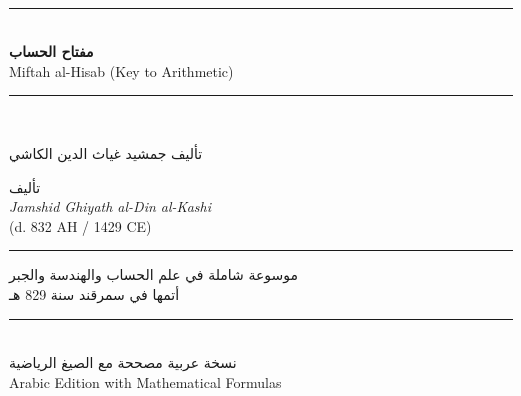 \documentclass[11pt,a4paper,openany,oneside]{book}
\newcommand{\ar}[1]{{\arabicfont\beginR #1\endR}}
\newcommand{\arLarge}[1]{{\Large\arabicfont\beginR #1\endR}}
\newenvironment{arabicbox}{%
  \begin{framed}
  \begin{minipage}{\dimexpr\linewidth-2\fboxsep-2\fboxrule\relax}
  \setlength{\parindent}{0pt}
  \linespread{1.3}\selectfont
}{%
  \end{minipage}
  \end{framed}
}
\newcommand{\longline}{\noindent\rule{\textwidth}{0.4pt}}
\newcommand{\shortline}{\noindent\rule{0.5\textwidth}{0.4pt}\par}
\begin{document}
\thispagestyle{empty}
\begin{center}
\vspace*{1.5cm}

{\fontsize{14}{16}\selectfont\ar{بسم الله الرحمن الرحيم}}\\[0.8cm]

{\color{rulecolor}\longline}\\[0.6cm]

{\fontsize{28}{34}\selectfont\bfseries\color{titlecolor}
\ar{مفتاح الحساب}}\\[0.5cm]

{\fontsize{18}{22}\selectfont\color{sectioncolor}
Miftah al-Hisab (Key to Arithmetic)}\\[0.3cm]

{\color{rulecolor}\longline}\\[1cm]

\begin{arabicbox}
\begin{center}
\arLarge{تأليف جمشيد غياث الدين الكاشي}
\end{center}
\end{arabicbox}

\vspace{0.8cm}

{\Large\ar{تأليف}}\\[0.3cm]
{\Large\textit{Jamshid Ghiyath al-Din al-Kashi}}\\[0.2cm]
{\normalsize (d. 832 AH / 1429 CE)}\\[0.5cm]

{\color{rulecolor}\shortline}

\vspace{0.5cm}

{\small\ar{موسوعة شاملة في علم الحساب والهندسة والجبر}}\\[0.2cm]
{\small\ar{أتمها في سمرقند سنة 829 هـ}}\\[0.5cm]

{\color{rulecolor}\longline}\\[1cm]

{\footnotesize\ar{نسخة عربية مصححة مع الصيغ الرياضية}}\\[0.3cm]
{\footnotesize Arabic Edition with Mathematical Formulas}\\[1cm]

\end{center}
\clearpage
\end{document}
